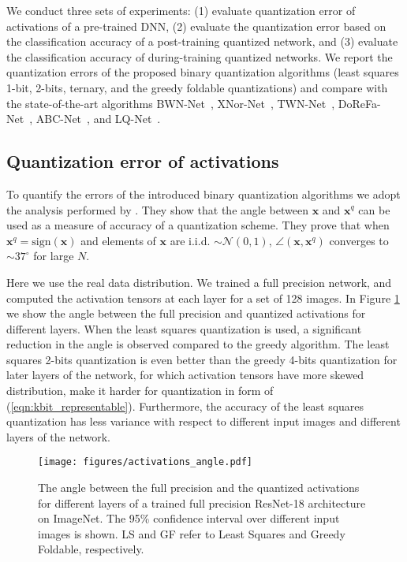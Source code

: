 \documentclass[10pt,twocolumn,letterpaper]{article}
\def\vx{{\bm{x}}}
\begin{document}
We conduct three sets of experiments: (1) evaluate quantization error of activations of a pre-trained DNN, (2) evaluate the quantization error based on the classification accuracy of a post-training quantized network, and (3) evaluate the classification accuracy of during-training quantized networks.
We report the quantization errors of the proposed binary quantization algorithms (least squares 1-bit, 2-bits, ternary, and the greedy foldable quantizations) and compare with the state-of-the-art algorithms BWN-Net~\cite{rastegari2016xnor}, XNor-Net~\cite{rastegari2016xnor}, TWN-Net~\cite{li2016ternary}, DoReFa-Net~\cite{zhou2016dorefa}, ABC-Net~\cite{lin2017towards}, and LQ-Net~\cite{zhang2018lq}.


\subsection{Quantization error of activations}\label{sec:sqr}
To quantify the errors of the introduced binary quantization algorithms we adopt the analysis performed by \cite{anderson2017high}. They show that the angle between $\vx$ and $\vx^q$ can be used as a measure of accuracy of a quantization scheme. They prove that when $\vx^q = \text{sign}(\vx)$ and elements of $\vx$ are i.i.d. $\sim \mathcal{N}(0,1)$, $\angle{(\vx, \vx^q)}$ converges to $\sim 37^{\circ}$ for large $N$.

Here we use the real data distribution.
We trained a full precision network, and computed the activation tensors at each layer for a set of 128 images. In Figure \ref{fig:angles} we show the angle between the full precision and quantized activations for different layers. When the least squares quantization is used, a significant reduction in the angle is observed compared to the greedy algorithm. The least squares 2-bits quantization is even better than the greedy 4-bits quantization for later layers of the network, for which activation tensors have more skewed distribution, make it harder for quantization in form of (\ref{eqn:kbit_representable}). Furthermore, the accuracy of the least squares quantization has less variance with respect to different input images and different layers of the network.

\begin{figure}[htb!]
\begin{center}
  \texttt{[image: figures/activations\_angle.pdf]}
 \caption{The angle between the full precision and the quantized activations for different layers of a trained full precision ResNet-18 architecture on ImageNet. The 95\% confidence interval over different input images is shown. LS and GF refer to Least Squares and Greedy Foldable, respectively.}
 \label{fig:angles}
 \end{center}
\end{figure}
\end{document}

